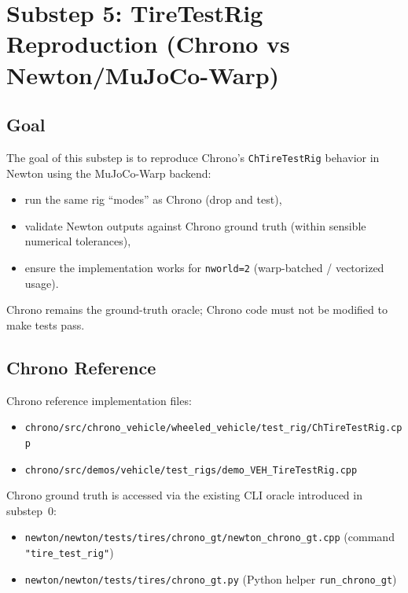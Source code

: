 %
%
\section{Substep 5: TireTestRig Reproduction (Chrono vs Newton/MuJoCo-Warp)}
\label{sec:substep5-tire-test-rig}

\subsection{Goal}
The goal of this substep is to reproduce Chrono's \texttt{ChTireTestRig} behavior in Newton using the MuJoCo-Warp backend:
\begin{itemize}
  \item run the same rig ``modes'' as Chrono (drop and test),
  \item validate Newton outputs against Chrono ground truth (within sensible numerical tolerances),
  \item ensure the implementation works for \texttt{nworld=2} (warp-batched / vectorized usage).
\end{itemize}
Chrono remains the ground-truth oracle; Chrono code must not be modified to make tests pass.

\subsection{Chrono Reference}
Chrono reference implementation files:
\begin{itemize}
  \item \texttt{chrono/src/chrono\_vehicle/wheeled\_vehicle/test\_rig/ChTireTestRig.cpp}
  \item \texttt{chrono/src/demos/vehicle/test\_rigs/demo\_VEH\_TireTestRig.cpp}
\end{itemize}

Chrono ground truth is accessed via the existing CLI oracle introduced in substep~0:
\begin{itemize}
  \item \texttt{newton/newton/tests/tires/chrono\_gt/newton\_chrono\_gt.cpp} (command \texttt{"tire\_test\_rig"})
  \item \texttt{newton/newton/tests/tires/chrono\_gt.py} (Python helper \texttt{run\_chrono\_gt})
\end{itemize}

